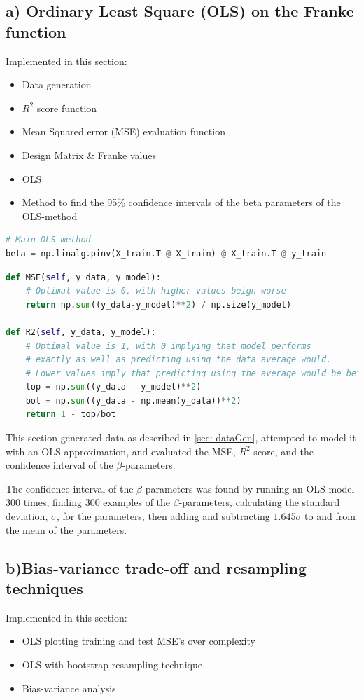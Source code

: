 \documentclass[a4paper, UKenglish]{article}
\newcommand{\0}{\mathbf{0}}
\newcommand{\1}{\mathbf{1}}
\begin{document}
\subsection{a) Ordinary Least Square (OLS) on the Franke function}
Implemented in this section:
\begin{itemize}
\item Data generation
\item $R^2$ score function
\item Mean Squared error (MSE) evaluation function
\item Design Matrix \& Franke values
\item OLS
\item Method to find the 95\% confidence intervals of the beta parameters of the OLS-method
\end{itemize}

\begin{lstlisting}[language=python]
# Main OLS method
beta = np.linalg.pinv(X_train.T @ X_train) @ X_train.T @ y_train
\end{lstlisting}

\begin{lstlisting}[language=python]
def MSE(self, y_data, y_model):
    # Optimal value is 0, with higher values beign worse
    return np.sum((y_data-y_model)**2) / np.size(y_model)

def R2(self, y_data, y_model):
    # Optimal value is 1, with 0 implying that model performs 
    # exactly as well as predicting using the data average would.
    # Lower values imply that predicting using the average would be better
    top = np.sum((y_data - y_model)**2)
    bot = np.sum((y_data - np.mean(y_data))**2)
    return 1 - top/bot
\end{lstlisting}

This section generated data as described in \cref{sec: dataGen}, attempted to model it with an OLS approximation, and evaluated the MSE, $R^2$ score, and the confidence interval of the $\beta$-parameters.

The confidence interval of the $\beta$-parameters was found by running an OLS model 300 times, finding 300 examples of the $\beta$-parameters, calculating the standard deviation, $\sigma$, for the parameters, then adding and subtracting $1.645\sigma$ to and from the mean of the parameters.

\subsection{b)Bias-variance trade-off and resampling techniques} \label{sec:method b)}
Implemented in this section:
\begin{itemize}
\item OLS plotting training and test MSE's over complexity
\item OLS with bootstrap resampling technique
\item Bias-variance analysis
\end{itemize}
\end{document}
